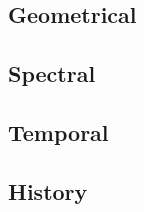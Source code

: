 \subsection{Geometrical}

\subsection{Spectral}

\subsection{Temporal}

\subsection{History}












